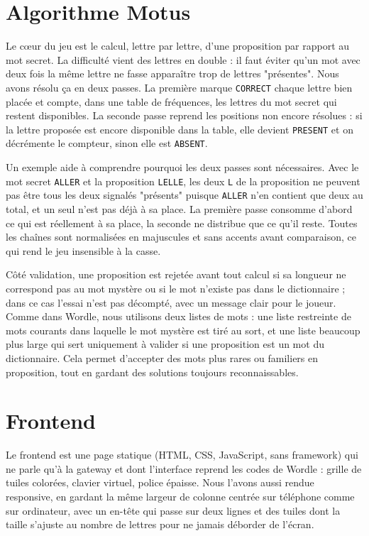 \documentclass[11pt,a4paper]{article}
\begin{document}
\section{Algorithme Motus}
Le c\oe{}ur du jeu est le calcul, lettre par lettre, d'une proposition par rapport au
mot secret. La difficulté vient des lettres en double : il faut éviter qu'un mot avec
deux fois la même lettre ne fasse apparaître trop de lettres "présentes". Nous avons
résolu ça en deux passes. La première marque \texttt{CORRECT} chaque lettre bien
placée et compte, dans une table de fréquences, les lettres du mot secret qui restent
disponibles. La seconde passe reprend les positions non encore résolues : si la
lettre proposée est encore disponible dans la table, elle devient \texttt{PRESENT} et
on décrémente le compteur, sinon elle est \texttt{ABSENT}.

Un exemple aide à comprendre pourquoi les deux passes sont nécessaires. Avec le mot
secret \texttt{ALLER} et la proposition \texttt{LELLE}, les deux \texttt{L} de la
proposition ne peuvent pas être tous les deux signalés "présents" puisque
\texttt{ALLER} n'en contient que deux au total, et un seul n'est pas déjà à sa place.
La première passe consomme d'abord ce qui est réellement à sa place, la seconde ne
distribue que ce qu'il reste. Toutes les chaînes sont normalisées en majuscules et
sans accents avant comparaison, ce qui rend le jeu insensible à la casse.

Côté validation, une proposition est rejetée avant tout calcul si sa longueur ne
correspond pas au mot mystère ou si le mot n'existe pas dans le dictionnaire ; dans
ce cas l'essai n'est pas décompté, avec un message clair pour le joueur. Comme dans
Wordle, nous utilisons deux listes de mots : une liste restreinte de mots courants
dans laquelle le mot mystère est tiré au sort, et une liste beaucoup plus large qui
sert uniquement à valider si une proposition est un mot du dictionnaire. Cela permet
d'accepter des mots plus rares ou familiers en proposition, tout en gardant des
solutions toujours reconnaissables.

\section{Frontend}
Le frontend est une page statique (HTML, CSS, JavaScript, sans framework) qui ne
parle qu'à la gateway et dont l'interface reprend les codes de Wordle : grille de
tuiles colorées, clavier virtuel, police épaisse. Nous l'avons aussi rendue
responsive, en gardant la même largeur de colonne centrée sur téléphone comme sur
ordinateur, avec un en-tête qui passe sur deux lignes et des tuiles dont la taille
s'ajuste au nombre de lettres pour ne jamais déborder de l'écran.
\end{document}
